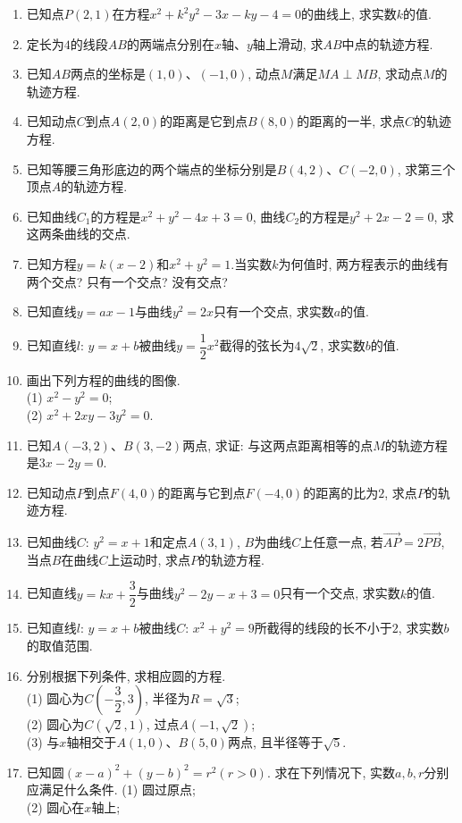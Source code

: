 \documentclass[10pt,a4paper]{article}
\begin{document}
\begin{enumerate}[1.]
\item 已知点$P(2,1)$在方程$x^2+k^2y^2-3x-ky-4=0$的曲线上, 求实数$k$的值.
\item 定长为$4$的线段$AB$的两端点分别在$x$轴、$y$轴上滑动, 求$AB$中点的轨迹方程.
\item 已知$AB$两点的坐标是$(1,0)$、$(-1,0)$, 动点$M$满足$MA\perp MB$, 求动点$M$的轨迹方程.
\item 已知动点$C$到点$A(2,0)$的距离是它到点$B(8,0)$的距离的一半, 求点$C$的轨迹方程.
\item 已知等腰三角形底边的两个端点的坐标分别是$B(4,2)$、$C(-2,0)$, 求第三个顶点$A$的轨迹方程.
\item 已知曲线$C_1$的方程是$x^2+y^2-4x+3=0$, 曲线$C_2$的方程是$y^2+2x-2=0$, 求这两条曲线的交点.
\item 已知方程$y=k(x-2)$和$x^2+y^2=1$.当实数$k$为何值时, 两方程表示的曲线有两个交点? 只有一个交点? 没有交点?
\item 已知直线$y=ax-1$与曲线$y^2=2x$只有一个交点, 求实数$a$的值.
\item 已知直线$l$: $y=x+b$被曲线$y=\dfrac 12x^2$截得的弦长为$4\sqrt 2$, 求实数$b$的值.
\item 画出下列方程的曲线的图像.\\
(1) $x^2-y^2=0$;\\ 
(2) $x^2+2xy-3y^2=0$.
\item 已知$A(-3,2)$、$B(3,-2)$两点, 求证: 与这两点距离相等的点$M$的轨迹方程是$3x-2y=0$.
\item 已知动点$P$到点$F(4,0)$的距离与它到点$F(-4,0)$的距离的比为$2$, 求点$P$的轨迹方程.
\item 已知曲线$C$: $y^2=x+1$和定点$A(3,1)$, $B$为曲线$C$上任意一点, 若$\overrightarrow {AP}=2\overrightarrow {PB}$, 当点$B$在曲线$C$上运动时, 求点$P$的轨迹方程.
\item 已知直线$y=kx+\dfrac 32$与曲线$y^2-2y-x+3=0$只有一个交点, 求实数$k$的值.
\item 已知直线$l$: $y=x+b$被曲线$C$: $x^2+y^2=9$所截得的线段的长不小于$2$, 求实数$b$的取值范围.
\item 分别根据下列条件, 求相应圆的方程.\\
(1) 圆心为$C(-\dfrac 32,3)$, 半径为$R=\sqrt 3$;\\
(2) 圆心为$C(\sqrt 2,1)$, 过点$A(-1,\sqrt 2)$;\\
(3) 与$x$轴相交于$A(1,0)$、$B(5,0)$两点, 且半径等于$\sqrt 5$.
\item 已知圆$(x-a)^2+(y-b)^2=r^2(r>0)$. 求在下列情况下, 实数$a,b,r$分别应满足什么条件.
(1) 圆过原点;\\
(2) 圆心在$x$轴上;\\

\end{enumerate}
\end{document}
